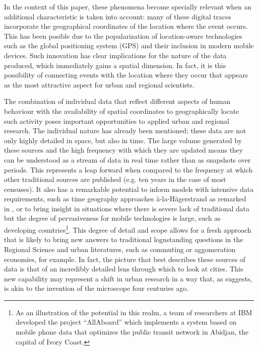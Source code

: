\documentclass[12pt]{article}
\begin{document}
In the context of this paper, these phenomena become specially relevant when an
additional characteristic is taken into account: many of these digital traces
incorporate the geographical coordinates of the location where the
event occurs. This has been posible due to the popularization of
location-aware technologies such as the global positioning system (GPS)
and their inclusion in modern mobile devices. Such innovation has clear
implications for the nature of the data produced, which immediately gains a
spatial dimension. In fact, it is this possibility of connecting events with the
location where they occur that appears as the most attractive aspect for
urban and regional scientists.

The combination of individual data that reflect different aspects of human
behaviour with the availability of spatial coordinates to geographically
locate such activity poses important opportunities to applied urban and
regional research.
The individual nature has already been mentioned;
these data are not only highly detailed in space, but also in time. The large
volume generated by these sources and the high frequency with which
they are updated means they can be understood as a stream of data in real time
rather than as snapshots over periods. This represents a leap forward when
compared to the frequency at which other traditional sources are published
(e.g. ten years in the case of most censuses). It also has a remarkable
potential to inform models with intensive data requirements, such as time geography approaches
\`{a}-la-H\"{a}gerstrand as remarked in \cite{sui_hagerstrand}, or to bring
insight in situations where there is severe lack of traditional data but the
degree of pervasiveness for mobile technologies is large, such as
developing countries\footnote{As an illustration of the
potential in this realm, a team of researchers at IBM developed the project
``AllAboard'' \citep{allaboard2013} which implements a system based on mobile
phone data that optimizes the public transit network in Abidjan, the capital
of Ivory Coast.}.
%
This degree of detail and scope allows for a fresh approach that is likely to
bring new answers to traditional lognstanding
questions in the Regional Science and urban literatures, such as commuting or
aggomeration economies, for example.
In fact, the picture that best describes these
sources of data is that of an incredibly detailed lens through which to look at cities.
This new capability may represent a shift in urban research in
a way that, as \cite{lohrNYT2012} suggests, is akin to the invention of the microscope four
centuries ago.
%
\end{document}
